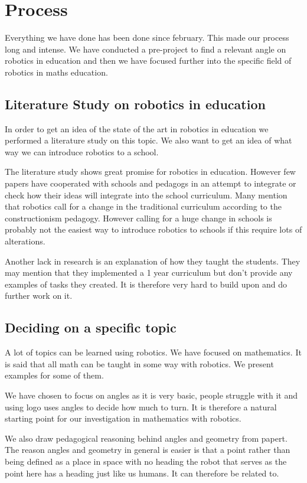 \chapter{Process}
Everything we have done has been done since february. This made our process long and intense. We have conducted a pre-project to find a relevant angle on robotics in education and then we have focused further into the specific field of robotics in maths education.

\section{Literature Study on robotics in education}
In order to get an idea of the state of the art in robotics in education we performed a literature study on this topic. We also want to get an idea of what way we can introduce robotics to a school.

The literature study shows great promise for robotics in education. However few papers have cooperated with schools and pedagogs in an attempt to integrate or check how their ideas will integrate into the school curriculum. Many mention that robotics call for a change in the traditional curriculum according to the constructionism pedagogy. However calling for a huge change in schools is probably not the easiest way to introduce robotics to schools if this require lots of alterations. 

Another lack in research is an explanation of how they taught the students. They may mention that they implemented a 1 year curriculum but don't provide any examples of tasks they created. It is therefore very hard to build upon and do further work on it. 


\section{Deciding on a specific topic}
A lot of topics can be learned using robotics. We have focused on mathematics. It is said that all math can be taught in some way with robotics. We present examples for some of them.

We have chosen to focus on angles as it is very basic, people struggle with it and using logo uses angles to decide how much to turn. It is therefore a natural starting point for our investigation in mathematics with robotics. 

We also draw pedagogical reasoning behind angles and geometry from papert. The reason angles and geometry in general is easier is that a point rather than being defined as a place in space with no heading the robot that serves as the point here has a heading just like us humans. It can therefore be related to. 

